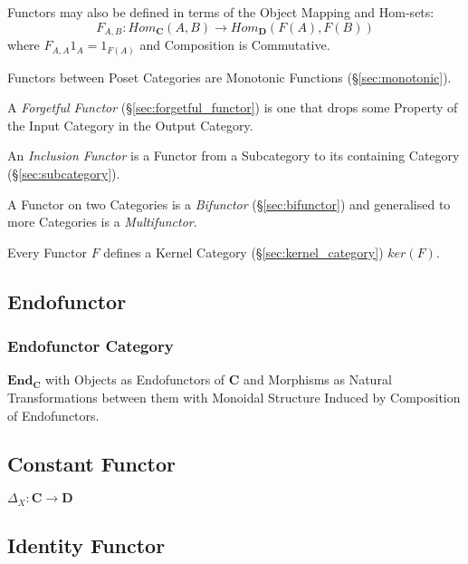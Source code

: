 Functors may also be defined in terms of the Object Mapping and
Hom-sets:
\[
  F_{A,B} : Hom_{\mathbf{C}}(A,B) \rightarrow Hom_{\mathbf{D}}(F(A),F(B))
\]
where $F_{A,A}1_A = 1_{F(A)}$ and Composition is Commutative.

Functors between Poset Categories are Monotonic Functions
(\S\ref{sec:monotonic}).

A \emph{Forgetful Functor} (\S\ref{sec:forgetful_functor}) is one that
drops some Property of the Input Category in the Output Category.

An \emph{Inclusion Functor} is a Functor from a Subcategory to its
containing Category (\S\ref{sec:subcategory}).

A Functor on two Categories is a \emph{Bifunctor}
(\S\ref{sec:bifunctor}) and generalised to more Categories is a
\emph{Multifunctor}.

Every Functor $F$ defines a Kernel Category
(\S\ref{sec:kernel_category}) $ker(F)$.



\subsection{Endofunctor}\label{sec:endofunctor}

\subsubsection{Endofunctor Category}\label{sec:endofunctor_category}

$\mathbf{End_C}$ with Objects as Endofunctors of $\mathbf{C}$ and
Morphisms as Natural Transformations between them with Monoidal
Structure Induced by Composition of Endofunctors.



\subsection{Constant Functor}\label{sec:constant_functor}

$\Delta_X : \mathbf{C} \rightarrow \mathbf{D}$



\subsection{Identity Functor}\label{sec:identity_functor}


